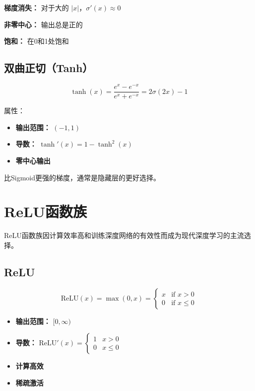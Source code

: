 \begin{disadvantages}
    \item \textbf{梯度消失：} 对于大的 $|x|$，$\sigma'(x) \approx 0$
    \item \textbf{非零中心：} 输出总是正的
    \item \textbf{饱和：} 在0和1处饱和
\end{disadvantages}

\subsection{双曲正切（Tanh）}

\begin{equation}
\tanh(x) = \frac{e^x - e^{-x}}{e^x + e^{-x}} = 2\sigma(2x) - 1
\end{equation}

属性：
\begin{itemize}
    \item \textbf{输出范围：} $(-1, 1)$
    \item \textbf{导数：} $\tanh'(x) = 1 - \tanh^2(x)$
    \item \textbf{零中心输出}
\end{itemize}

比Sigmoid更强的梯度，通常是隐藏层的更好选择。

\section{ReLU函数族}

ReLU函数族因计算效率高和训练深度网络的有效性而成为现代深度学习的主流选择。

\subsection{ReLU}

\begin{equation}
\text{ReLU}(x) = \max(0, x) = 
\begin{cases}
x & \text{if } x > 0 \\
0 & \text{if } x \leq 0
\end{cases}
\end{equation}

\begin{properties}[ReLU属性]
\begin{itemize}
    \item \textbf{输出范围：} $[0, \infty)$
    \item \textbf{导数：} $\text{ReLU}'(x) = \begin{cases} 1 & x > 0 \\ 0 & x \leq 0 \end{cases}$
    \item \textbf{计算高效}
    \item \textbf{稀疏激活}
\end{itemize}
\end{properties}

